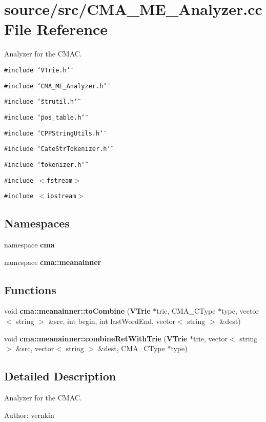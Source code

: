 \section{source/src/CMA\_\-ME\_\-Analyzer.cc File Reference}
\label{CMA__ME__Analyzer_8cc}
Analyzer for the CMAC. 

{\tt \#include \char`\"{}VTrie.h\char`\"{}}\par
{\tt \#include \char`\"{}CMA\_\-ME\_\-Analyzer.h\char`\"{}}\par
{\tt \#include \char`\"{}strutil.h\char`\"{}}\par
{\tt \#include \char`\"{}pos\_\-table.h\char`\"{}}\par
{\tt \#include \char`\"{}CPPStringUtils.h\char`\"{}}\par
{\tt \#include \char`\"{}CateStrTokenizer.h\char`\"{}}\par
{\tt \#include \char`\"{}tokenizer.h\char`\"{}}\par
{\tt \#include $<$fstream$>$}\par
{\tt \#include $<$iostream$>$}\par
\subsection*{Namespaces}
\begin{CompactItemize}
\item 
namespace \textbf{cma}
\item 
namespace \textbf{cma::meanainner}
\end{CompactItemize}
\subsection*{Functions}
\begin{CompactItemize}
\item 
void {\bf cma::meanainner::toCombine} ({\bf VTrie} $\ast$trie, CMA\_\-CType $\ast$type, vector$<$ string $>$ \&src, int begin, int lastWordEnd, vector$<$ string $>$ \&dest)
\item 
void \textbf{cma::meanainner::combineRetWithTrie} ({\bf VTrie} $\ast$trie, vector$<$ string $>$ \&src, vector$<$ string $>$ \&dest, CMA\_\-CType $\ast$type)\label{namespacecma_1_1meanainner_aba0478eb017501ee85814fcbc0486fa}

\end{CompactItemize}


\subsection{Detailed Description}
Analyzer for the CMAC. 

\begin{Desc}
\item[Author:]vernkin \end{Desc}
